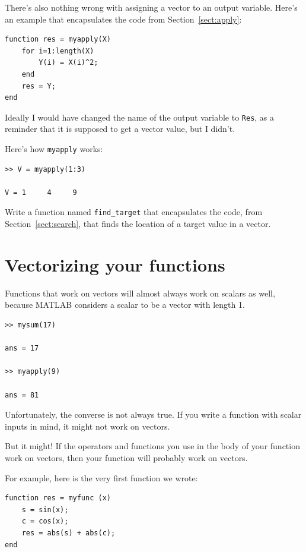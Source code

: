 \documentclass[
]{book}
\begin{document}
There's also nothing wrong with assigning a vector to an output
variable.  Here's an example that encapsulates the code from
Section~\ref{sect:apply}:

\begin{verbatim}
function res = myapply(X)
    for i=1:length(X)
        Y(i) = X(i)^2;
    end
    res = Y;
end
\end{verbatim}

Ideally I would have changed the name of the output variable to
{\tt Res}, as a reminder that it is supposed to get a vector value,
but I didn't.

Here's how {\tt myapply} works:

\begin{verbatim}
>> V = myapply(1:3)

V = 1     4     9
\end{verbatim}

\begin{ex}
Write a function named {\tt find\_target} that
encapsulates the code, from Section~\ref{sect:search}, that finds the
location of a target value in a vector.
\end{ex}


\section{Vectorizing your functions}

Functions that work on vectors will almost always work on scalars
as well, because MATLAB considers a scalar to be a vector with
length 1.

\begin{verbatim}
>> mysum(17)

ans = 17

>> myapply(9)

ans = 81
\end{verbatim}

Unfortunately, the converse is not always true.  If you write
a function with scalar inputs in mind, it might not work on vectors.

But it might!  If the operators and functions
you use in the body of your function work on vectors, then your
function will probably work on vectors.

For example, here is the very first function we wrote:

\begin{verbatim}
function res = myfunc (x)
    s = sin(x);
    c = cos(x);
    res = abs(s) + abs(c);
end
\end{verbatim}
\end{document}
